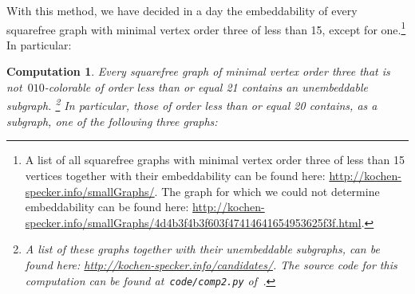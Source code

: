 \documentclass{report}
\newtheorem{comp}{Computation}[section]
\begin{document}
With this method, we have decided in a day the embeddability
of every squarefree graph with minimal vertex order three of
less than 15, except for one.\footnote{%
A list of all squarefree graphs with minimal vertex order three of
less than 15 vertices together with their embeddability can
be found here:
\url{http://kochen-specker.info/smallGraphs/}.
The graph for which we could not determine
embeddability can be found
here: \url{http://kochen-specker.info/smallGraphs/4d4b3f4b3f603f47414641654953625f3f.html}.
}
In particular:
\begin{comp}\label{comp:unemb20}
Every squarefree graph of minimal vertex order three that is
not~$010$-colorable of order less than or equal 21
contains an unembeddable subgraph.%
\footnote{A list of these graphs together with their unembeddable
subgraphs, can be found here:
\url{http://kochen-specker.info/candidates/}.
The source code for this computation can be found
at~\texttt{code/comp2.py} of~\cite{GH}.}
In particular, those of order less than or equal 20
    contains, as a subgraph, one of the following three graphs:
    \begin{center}
        \qquad
\end{center}
\end{comp}
\end{document}
